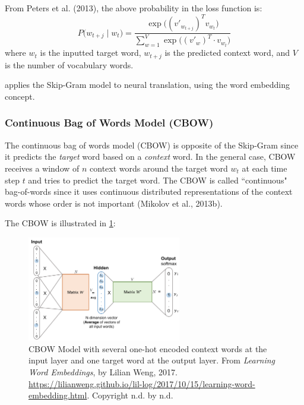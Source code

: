 From Peters et al. (2013), the above probability in the loss function is:
$$
P \Big( w_{t+j} \; | \; w_t \Big) = \frac {\exp{ \Big( (v'_{w_{t+j}})^T  v_{w_t} \Big) }} {\sum_{w=1}^V \exp{ \Big( (v'_w)^T \cdot v_{w_t} \Big) }}
$$
where $w_t$ is the inputted target word, $w_{t+j}$ is the predicted context word, and $V$ is the number of vocabulary words. 
\newline

 applies the Skip-Gram model to neural translation, using the word embedding concept. 


\subsubsection{Continuous Bag of Words Model (CBOW)} \label{sec:CBOW}

The continuous bag of words model (CBOW) is opposite of the Skip-Gram since it predicts the \emph{target} word based on a \emph{context} word. In the general case, CBOW receives a window of $n$ context words around the target word $w_t$ at each time step $t$ and tries to predict the target word. The CBOW is called ``continuous" bag-of-words since it uses continuous distributed representations of the context words whose order is not important (Mikolov et al., 2013b). 

The CBOW is illustrated in \cref{fig:CBOW}: 

\begin{figure}[h] 
\vspace{-5pt}
\centering
\includegraphics[width=0.6\textwidth]{imgs/cbow.png}
\vspace{-5pt}
\caption{\footnotesize CBOW Model with several one-hot encoded context words at the input layer and one target word at the output layer. From \emph{Learning Word Embeddings}, by Lilian Weng, 2017. \url{https://lilianweng.github.io/lil-log/2017/10/15/learning-word-embedding.html}. Copyright n.d. by n.d.}
\label{fig:CBOW}
\vspace{-5pt}
\end{figure}

